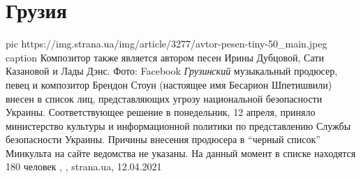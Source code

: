  
 
 
 
 
\chapter{Грузия}

\ifcmt
  pic https://img.strana.ua/img/article/3277/avtor-pesen-tiny-50_main.jpeg
	caption Композитор также является автором песен Ирины Дубцовой, Сати Казановой и Лады Дэнс. Фото: Facebook 
\fi
\emph{Грузинский} музыкальный продюсер, певец и композитор Брендон Стоун
(настоящее имя Бесарион Шпетишвили) внесен в список лиц, представляющих угрозу
национальной безопасности Украины.  Соответствующее решение в понедельник, 12
апреля, приняло министерство культуры и информационной политики по
представлению Службы безопасности Украины.  Причины внесения продюсера в
\enquote{черный список} Минкульта на сайте ведомства не указаны. На данный
момент в списке находятся 180 человек
, , strana.ua, 12.04.2021

